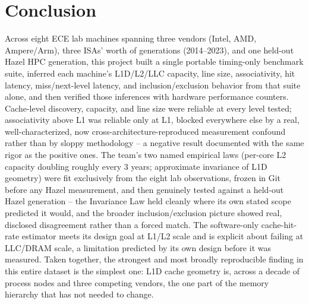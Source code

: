 \documentclass{article}
\begin{document}
\section{Conclusion}

Across eight ECE lab machines spanning three vendors (Intel, AMD, Ampere/Arm), three ISAs'
worth of generations (2014--2023), and one held-out Hazel HPC generation, this project built
a single portable timing-only benchmark suite, inferred each machine's L1D/L2/LLC capacity,
line size, associativity, hit latency, miss/next-level latency, and inclusion/exclusion
behavior from that suite alone, and then verified those inferences with hardware performance
counters. Cache-level discovery, capacity, and line size were reliable at every level tested;
associativity above L1 was reliable only at L1, blocked everywhere else by a real,
well-characterized, now cross-architecture-reproduced measurement confound rather than by
sloppy methodology -- a negative result documented with the same rigor as the positive ones.
The team's two named empirical laws (per-core L2 capacity doubling roughly every 3 years;
approximate invariance of L1D geometry) were fit exclusively from the eight lab observations,
frozen in Git before any Hazel measurement, and then genuinely tested against a held-out
Hazel generation -- the Invariance Law held cleanly where its own stated scope predicted it
would, and the broader inclusion/exclusion picture showed real, disclosed disagreement rather
than a forced match. The software-only cache-hit-rate estimator meets its design goal at
L1/L2 scale and is explicit about failing at LLC/DRAM scale, a limitation predicted by its
own design before it was measured. Taken together, the strongest and most broadly
reproducible finding in this entire dataset is the simplest one: L1D cache geometry is,
across a decade of process nodes and three competing vendors, the one part of the memory
hierarchy that has not needed to change.

\newpage


\setcounter{section}{13}
\renewcommand{\thesection}{\arabic{section}}
\end{document}
